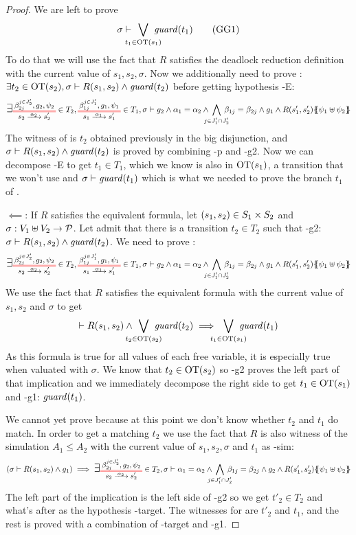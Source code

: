 \documentclass{article}
\begin{document}
\begin{proof}
	We are left to prove \[ \sigma \vdash \bigvee_\subbox{t_1 \in \fOT{s_1}} \fguard{t_1} \goal{G1} \]
	To do that we will use the fact that \(R\) satisfies the deadlock reduction definition with the current value of \(s_1, s_2, \sigma\).
	Now we additionally need to prove : \(\exists t_2 \in \mathrm{OT}{\left(s_2\right)}, \sigma \vdash R{\left(s_1, s_2\right)} \wedge \mathit{guard}{\left(t_2\right)}\) before getting hypothesis \hyp{E}:
	\[ \bigsymb{\exists} \OTx{2}{}{2}{2} \in T_2, \OTx{1}{}{1}{1} \in T_1, \sigma \vdash g_2 \wedge \alpha_1 = \alpha_2 \wedge \bigwedge_\subbox{j \in J'_1 \cap J'_2} \beta_{1j} = \beta_{2j} \wedge g_1 \wedge R\mpar{s'_1, s'_2}\psubst{\psi_1 \uplus \psi_2} \]
	The witness of  is \(t_2\) obtained previously in the big disjunction, and \(\sigma \vdash R{\left(s_1, s_2\right)} \wedge \mathit{guard}{\left(t_2\right)}\) is proved by combining \hyp{p} and \hyp{g2}.
	Now we can decompose \hyp{E} to get \(t_1 \in T_1\), which we know is also in \(\mathrm{OT}{\left(s_1\right)}\), a transition that we won't use and \(\sigma \vdash \mathit{guard}{\left(t_1\right)}\) which is what we needed to prove the branch \(t_1\) of .
\item[\(\impliedby\):] If \(R\) satisfies the equivalent formula, let \({\left(s_1, s_2\right)} \in S_1 \times S_2\) and \(\sigma: V_1 \uplus V_2 \to \mathcal{P}\).
	Let admit that there is a transition \(t_2 \in T_2\) such that \hyp{g2}: \(\sigma \vdash R{\left(s_1, s_2\right)} \wedge \mathit{guard}{\left(t_2\right)}\).
	We need to prove :
	\[ \bigsymb{\exists} \OTx{2}{}{2}{2} \in T_2, \OTx{1}{}{1}{1} \in T_1, \sigma \vdash g_2 \wedge \alpha_1 = \alpha_2 \wedge \bigwedge_\subbox{j \in J'_1 \cap J'_2} \beta_{1j} = \beta_{2j} \wedge g_1 \wedge R\mpar{s'_1, s'_2}\psubst{\psi_1 \uplus \psi_2} \]
	We use the fact that \(R\) satisfies the equivalent formula with the current value of \(s_1, s_2\) and \(\sigma\) to get
	\[ \vdash R\mpar{s_1, s_2} \wedge \bigvee_\subbox{t_2 \in \fOT{s_2}} \fguard{t_2} \implies \bigvee_\subbox{t_1 \in \fOT{s_1}} \fguard{t_1} \]
	As this formula is true for all values of each free variable, it is especially true when valuated with \(\sigma\).
	We know that \(t_2 \in \mathrm{OT}{\left(s_2\right)}\) so \hyp{g2} proves the left part of that implication and we immediately decompose the right side to get \(t_1 \in \mathrm{OT}{\left(s_1\right)}\) and \hyp{g1}: \(\mathit{guard}{\left(t_1\right)}\).

	We cannot yet prove  because at this point we don't know whether \(t_2\) and \(t_1\) do match.
	In order to get a matching \(t_2\) we use the fact that \(R\) is also witness of the simulation \(A_1 \leq A_2\) with the current value of \(s_1, s_2, \sigma\) and \(t_1\) as \hyp{sim}:
	\[ \mpar{\sigma \vdash R\mpar{s_1, s_2} \wedge g_1} \implies \bigsymb{\exists} \OTx{2}{}{2}{2} \in T_2, \sigma \vdash \alpha_1 = \alpha_2 \wedge \bigwedge_\subbox{j \in J'_1 \cap J'_2} \beta_{1j} = \beta_{2j} \wedge g_2 \wedge R\mpar{s'_1, s'_2}\psubst{\psi_1 \uplus \psi_2} \]
	The left part of the implication is the left side of \hyp{g2} so we get \(t'_2 \in T_2\) and what's after as the hypothesis \hyp{target}.
	The witnesses for  are \(t'_2\) and \(t_1\), and the rest is proved with a combination of \hyp{target} and \hyp{g1}.
\end{proof}
\end{document}
